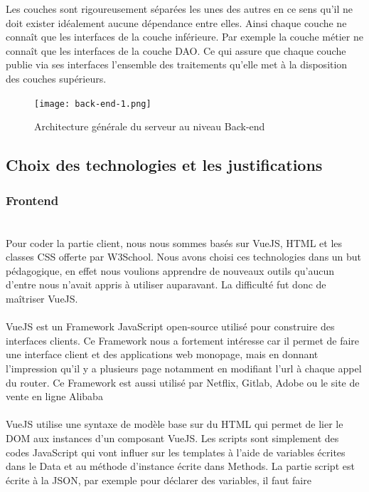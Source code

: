 \documentclass[12pt]{article}
\begin{document}
Les couches sont rigoureusement séparées les unes des autres en ce sens qu'il ne doit exister idéalement aucune dépendance entre elles. Ainsi chaque couche ne connaît que les interfaces de la couche inférieure. Par exemple la couche métier ne connaît que les interfaces de la couche DAO. Ce qui assure que chaque couche publie via ses interfaces l'ensemble des traitements qu'elle met à la disposition des couches supérieurs.

\begin{figure}[htbp]
    \centering
    \texttt{[image: back-end-1.png]}
    \caption{Architecture générale du serveur au niveau Back-end}
    \label{fig:archiApplication}
\end{figure}
\subsection{Choix des technologies et les justifications}
\subsubsection{Frontend}
\paragraph{} \leavevmode \\
Pour coder la partie client, nous nous sommes basés sur VueJS, HTML et les classes CSS offerte par W3School. Nous avons choisi ces technologies dans un but pédagogique, en effet nous voulions apprendre de nouveaux outils qu’aucun d’entre nous n’avait appris à utiliser auparavant. La difficulté fut donc de maîtriser VueJS.
\paragraph{}
VueJS est un Framework JavaScript open-source utilisé pour construire des interfaces clients. Ce Framework nous a fortement intéresse car il permet de faire une interface client et des applications web monopage, mais en donnant l’impression qu’il y a plusieurs page notamment en modifiant l’url à chaque appel du router. Ce Framework est aussi utilisé par Netflix, Gitlab, Adobe ou le site de vente en ligne Alibaba

\paragraph{}
VueJS utilise une syntaxe de modèle base sur du HTML qui permet de lier le DOM aux instances d’un composant VueJS. Les scripts sont simplement des codes JavaScript qui vont influer sur les templates à l’aide de variables écrites dans le Data et au méthode d’instance écrite dans Methods. La partie script est écrite à la JSON, par exemple pour déclarer des variables, il faut faire
\end{document}
